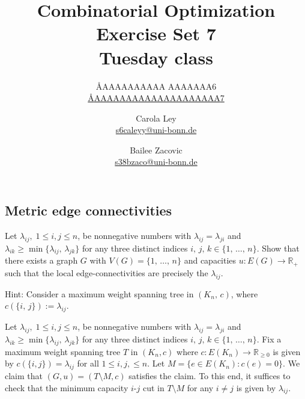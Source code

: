 \documentclass{article}
\title{Combinatorial Optimization \\ Exercise Set 7 \\ Tuesday class}
\author{
  \AA{AAAAAAAAAA AAAAAAA}{6} \\
  \href{mailto:\AA{AAAAAAAAAAAAAAAAAAAA}{7}}{\AA{AAAAAAAAAAAAAAAAAAAA}{7}}
  \and
  Carola Ley \\
  \href{mailto:s6caleyy@uni-bonn.de}{s6caleyy@uni-bonn.de}
  \and
  Bailee Zacovic \\
  \href{mailto:s38bzaco@uni-bonn.de}{s38bzaco@uni-bonn.de}
}
\newcommand{\R}{\mathbb{R}}
\begin{document}
  \maketitle

  \setcounter{section}{7}
  \subsection{Metric edge connectivities}
  \begin{centerframebox}
    Let $\lambda_{ij},\; 1 \leq i, j \leq n$, be nonnegative numbers with $\lambda_{ij} = \lambda_{ji}$ and
    $\lambda_{ik} \geq \min\{\lambda_{ij},\, \lambda_{jk}\}$ for any three distinct indices $i,\, j,\, k \in \{1,\, \dots,\, n\}$.
    Show that there exists a graph $G$ with $V(G) = \{1,\, \dots,\, n\}$ and capacities $u: E(G) \to \R_+$ such
    that the local edge-connectivities are precisely the $\lambda_{ij}$.

    Hint: Consider a maximum weight spanning tree in $(K_n,\, c)$, where $c(\{i,\, j\}) := \lambda_{ij}$.
  \end{centerframebox}
  Let $\lambda_{ij},\; 1 \leq i, j \leq n$, be nonnegative numbers with $\lambda_{ij} = \lambda_{ji}$ and $\lambda_{ik} \geq \min\{\lambda_{ij},\, \lambda_{jk}\}$ for any three distinct indices $i,\, j,\, k \in \{1,\, \dots,\, n\}$. Fix a maximum weight spanning tree $T$ in $(K_n,c)$ where $c:E(K_n)\rightarrow \mathbb{R}_{\geq 0}$ is given by $c(\{i,j\})=\lambda_{ij}$ for all $1\leq i,j,\leq n.$ Let $M=\{e\in E(K_n):c(e)=0\}.$ We claim that $(G,u)=(T\setminus M,c)$ satisfies the claim. To this end, it suffices to check that the minimum capacity $i$-$j$ cut in $T\setminus M$ for any $i\neq j$ is given by $\lambda_{ij}.$
\end{document}
